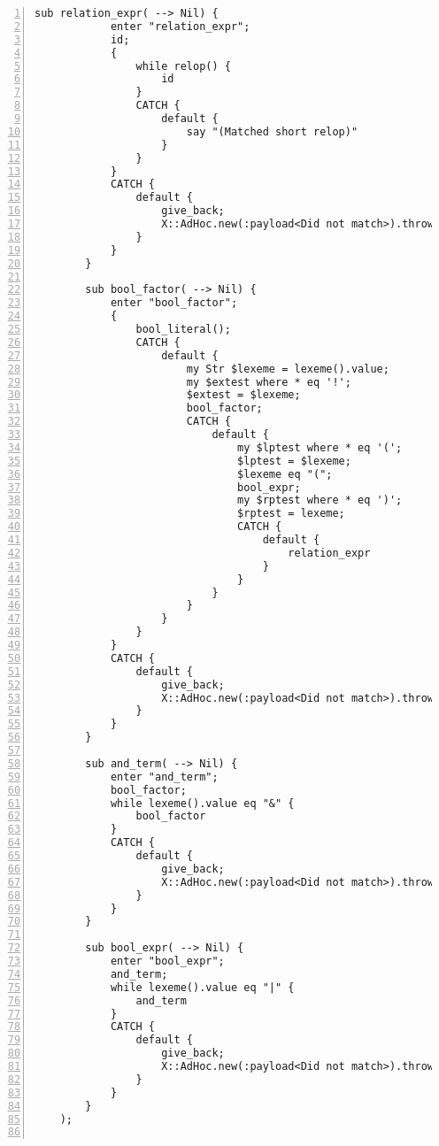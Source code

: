 \documentclass[17pt,english]{extarticle}
\begin{document}
\begin{lstlisting}[numbers=left,basicstyle={\scriptsize\ttfamily},extendedchars=true]
        sub relation_expr( --> Nil) {
            enter "relation_expr";
            id;
            {
                while relop() {
                    id
                }
                CATCH {
                    default {
                        say "(Matched short relop)"
                    }
                }
            }
            CATCH {
                default {
                    give_back;
                    X::AdHoc.new(:payload<Did not match>).throw
                }
            }
        }

        sub bool_factor( --> Nil) {
            enter "bool_factor";
            {
                bool_literal();
                CATCH {
                    default {
                        my Str $lexeme = lexeme().value;
                        my $extest where * eq '!';
                        $extest = $lexeme;
                        bool_factor;
                        CATCH {
                            default {
                                my $lptest where * eq '(';
                                $lptest = $lexeme;
                                $lexeme eq "(";
                                bool_expr;
                                my $rptest where * eq ')';
                                $rptest = lexeme;
                                CATCH {
                                    default {
                                        relation_expr
                                    }
                                }
                            }
                        }
                    }
                }
            }
            CATCH {
                default {
                    give_back;
                    X::AdHoc.new(:payload<Did not match>).throw
                }
            }
        }

        sub and_term( --> Nil) {
            enter "and_term";
            bool_factor;
            while lexeme().value eq "&" {
                bool_factor
            }
            CATCH {
                default {
                    give_back;
                    X::AdHoc.new(:payload<Did not match>).throw
                }
            }
        }

        sub bool_expr( --> Nil) {
            enter "bool_expr";
            and_term;
            while lexeme().value eq "|" {
                and_term
            }
            CATCH {
                default {
                    give_back;
                    X::AdHoc.new(:payload<Did not match>).throw
                }
            }
        }
    );


\end{lstlisting}
\end{document}
